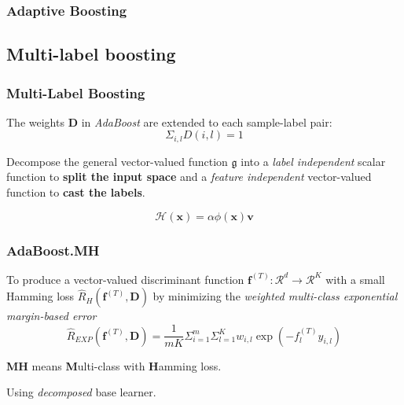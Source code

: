 \documentclass{beamer}
\begin{document}
\begin{frame}
\frametitle{Adaptive Boosting}

\begin{algorithm}[H]
\end{algorithm}

\end{frame}

\subsection{Multi-label boosting}

\begin{frame}
\frametitle{Multi-Label Boosting}

The weights $\mathbf{D}$ in \textit{AdaBoost} are extended to each sample-label pair:
$${\Sigma}_{i,l} D(i, l) = 1$$


  Decompose the general vector-valued function $\mathfrak{g}$ into a \textit{label independent} scalar function to \textbf{split the input space} and a \textit{feature independent} vector-valued function to \textbf{cast the labels}.

$$\mathcal{H}(\mathbf{x}) = \alpha  \phi(\mathbf{x}) \mathbf{v}$$

\end{frame}

\begin{frame}
\frametitle{AdaBoost.MH}
To produce a vector-valued discriminant function $\mathbf{f}^{(T)} : \mathcal{R}^d \rightarrow \mathcal{R}^K$ with a small Hamming loss $\hat{R}_H (\mathbf{f}^{(T)}, \mathbf{D})$ by minimizing the \textit{weighted multi-class exponential margin-based error}
$$\hat{R}_{EXP}(\mathbf{f}^{(T)}, \mathbf{D}) = \frac{1}{mK} {{\Sigma}_{i=1}^m} {{\Sigma}_{l=1}^K} {w_{i,l}\exp(- f_l^{(T)} y_{i,l})}$$

\begin{block}{}
\textbf{MH} means \textbf{M}ulti-class with \textbf{H}amming loss.
\end{block}

\begin{block}{}
Using \textit{decomposed} base learner.
\end{block}
\end{frame}
\end{document}
